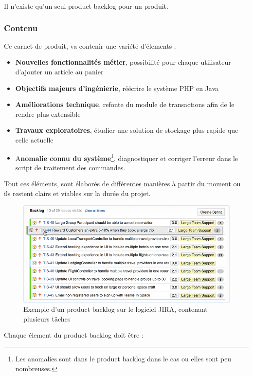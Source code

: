 Il n'existe qu'un seul product backlog pour un produit. 

\subsubsection{Contenu}

Ce carnet de produit, va contenir une variété d'élements : 

\begin{itemize}
\item \textbf{Nouvelles fonctionnalités métier}, possibilité pour chaque utilisateur d'ajouter un article au panier
\item \textbf{Objectifs majeurs d'ingénierie}, réécrire le système PHP en Java
\item \textbf{Améliorations technique}, refonte du module de transactions afin de le rendre plus extensible
\item \textbf{Travaux exploratoires}, étudier une solution de stockage plus rapide que celle actuelle
\item A\textbf{nomalie connu du système}\footnote{
Les anomalies sont dans le product backlog dans le cas ou elles sont peu nombreuses. }, diagnostiquer et corriger l'erreur dans le script de traitement des commandes. 
\end{itemize}


Tout ces éléments, sont élaborés de différentes manières à partir du moment ou ils restent clairs et viables sur la durée du projet. 


\begin{figure}[h!]
\centering
\includegraphics[width=1\textwidth]{assets/product_backlog.png}
\caption{Exemple d'un product backlog sur le logiciel JIRA, contenant plusieurs tâches}
\label{fig:my_label}
\end{figure}

Chaque élement du product backlog doit être : 

